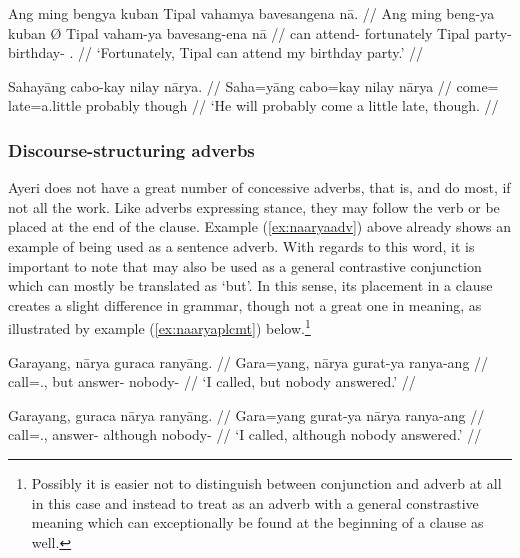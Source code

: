 \pex\label{ex:stanceadv}
\a \begingl
	\gla Ang ming bengya kuban {} Tipal vahamya bavesangena nā. //
	\glb Ang ming beng-ya kuban Ø Tipal vaham-ya bavesang-ena nā //
	\glc \AgtT{} can attend-\TsgM{} fortunately \Top{} Tipal party-\Loc{} 
		birthday-\Gen{} \Fsg{}.\Gen{} //
	\glft `Fortunately, Tipal can attend my birthday party.' //
\endgl

\a\label{ex:naaryaadv} \begingl
	\gla Sahayāng cabo-kay nilay nārya. //
	\glb Saha=yāng cabo=kay nilay nārya //
	\glc come=\TsgM{} late=a.little probably though //
	\glft `He will probably come a little late, though. //
\endgl
\xe

\subsubsection{Discourse-structuring adverbs}
\label{subsubsec:discourseadv}

Ayeri does not have a great number of concessive adverbs, that is,
 and  do most, if not all the work. Like adverbs expressing stance,
they may follow the verb or be placed at the end of the clause. Example
(\ref{ex:naaryaadv}) above already shows an example of 
being used as a sentence adverb. With regards to this word, it is important to
note that  may also be used as a general contrastive
conjunction which can mostly be translated as `but'. In this sense, its
placement in a clause creates a slight difference in grammar, though not a
great one in meaning, as illustrated by example (\ref{ex:naaryaplcmt})
below.\footnote{Possibly it is easier not to distinguish between conjunction
and adverb at all in this case and instead to treat  as an
adverb with a general constrastive meaning which can exceptionally be found at
the beginning of a clause as well.\label{fn:naaryapos}}

\pex\label{ex:naaryaplcmt}
\a\label{ex:naaryaconj}\begingl
	\gla Garayang, nārya guraca ranyāng. //
	\glb Gara=yang, nārya gurat-ya ranya-ang //
	\glc call=\Fsg{}.\Aarg{}, but answer-\TsgM{} nobody-\Aarg{} //
	\glft `I called, but nobody answered.' //
\endgl

\a\label{ex:naaryaadv2}\begingl
	\gla Garayang, guraca nārya ranyāng. //
	\glb Gara=yang gurat-ya nārya ranya-ang //
	\glc call=\Fsg{}.\Aarg{}, answer-\TsgM{} although nobody-\Aarg{} //
	\glft `I called, although nobody answered.' //
\endgl

\xe

